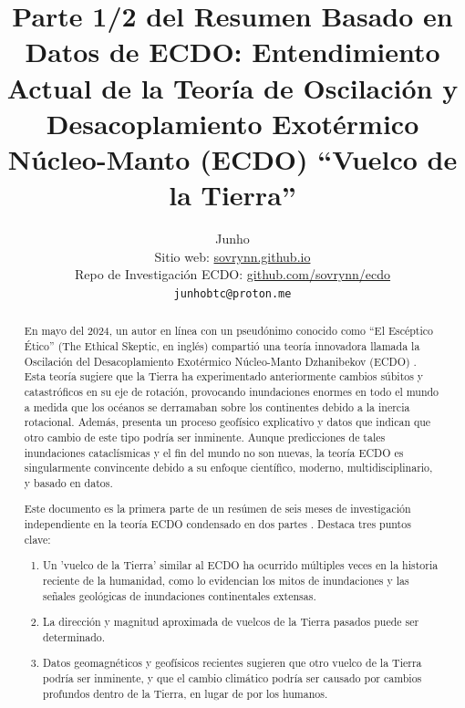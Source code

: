 \documentclass[10pt,twocolumn,letterpaper]{article}
\begin{document}
\title{Parte 1/2 del Resumen Basado en Datos de ECDO: Entendimiento Actual de la Teoría de Oscilación y Desacoplamiento Exotérmico Núcleo-Manto (ECDO) “Vuelco de la Tierra”}

\author{Junho\\
Sitio web: \href{https://sovrynn.github.io}{sovrynn.github.io}\\
Repo de Investigación ECDO: \href{https://github.com/sovrynn/ecdo}{github.com/sovrynn/ecdo}\\
{\tt\small junhobtc@proton.me}
}

\maketitle

\begin{abstract}
En mayo del 2024, un autor en línea con un pseudónimo conocido como “El Escéptico Ético” \cite{0} (The Ethical Skeptic, en inglés) compartió una teoría innovadora llamada la Oscilación del Desacoplamiento Exotérmico Núcleo-Manto Dzhanibekov (ECDO) \cite{1}. Esta teoría sugiere que la Tierra ha experimentado anteriormente cambios súbitos y catastróficos en su eje de rotación, provocando inundaciones enormes en todo el mundo a medida que los océanos se derramaban sobre los continentes debido a la inercia rotacional. Además, presenta un proceso geofísico explicativo y datos que indican que otro cambio de este tipo podría ser inminente. Aunque predicciones de tales inundaciones cataclísmicas y el fin del mundo no son nuevas, la teoría ECDO es singularmente convincente debido a su enfoque científico, moderno, multidisciplinario, y basado en datos.

Este documento es la primera parte de un resúmen de seis meses de investigación independiente en la teoría ECDO condensado en dos partes \cite{2,20}. Destaca tres puntos clave:

\begin{flushleft}
\begin{enumerate}
    \item Un 'vuelco de la Tierra' similar al ECDO ha ocurrido múltiples veces en la historia reciente de la humanidad, como lo evidencian los mitos de inundaciones y las señales geológicas de inundaciones continentales extensas.
    \item La dirección y magnitud aproximada de vuelcos de la Tierra pasados puede ser determinado.
    \item Datos geomagnéticos y geofísicos recientes sugieren que otro vuelco de la Tierra podría ser inminente, y que el cambio climático podría ser causado por cambios profundos dentro de la Tierra, en lugar de por los humanos.
\end{enumerate}
\end{flushleft}


\end{abstract}
\end{document}
